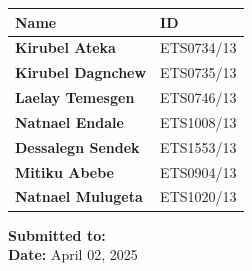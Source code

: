 \documentclass[12pt]{article}
\begin{document}
\begin{center} %
    \renewcommand{\arraystretch}{1.2} %
    \begin{tabularx}{0.8\textwidth}{@{}>{\bfseries}l X @{}} %
        \toprule
        Name               & ID           \\ 
        \midrule
        Kirubel Ateka      & ETS0734/13   \\
        Kirubel Dagnchew   & ETS0735/13   \\
        Laelay Temesgen    & ETS0746/13   \\
        Natnael Endale     & ETS1008/13   \\
        Dessalegn Sendek   & ETS1553/13   \\
        Mitiku Abebe       & ETS0904/13   \\
        Natnael Mulugeta   & ETS1020/13   \\
        \bottomrule
    \end{tabularx}
\end{center}

\vfill %

\begin{flushright} %
    \large %
    \textbf{Submitted to:} \underline{\hspace{5cm}} \\[1em] %
    \textbf{Date:} April 02, 2025 %
\end{flushright}
\vspace{1cm} %
\end{document}
